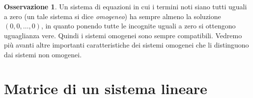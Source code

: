 \documentclass{book}
\theoremstyle{definition}
\newtheorem{oss}{Osservazione}[section]
\theoremstyle{plain}
\begin{document}
\begin{oss}
  \label{oss:eqlinematrici1}
  Un sistema di equazioni in cui i termini noti siano tutti uguali a zero
  (un tale sistema si dice \textit{omogeneo}) ha sempre almeno la
  soluzione $(0,0,\dots,0)$, in quanto ponendo tutte le incognite uguali
  a zero si ottengono uguaglianza vere. Quindi i sistemi omogenei sono
  sempre compatibili. Vedremo più avanti altre importanti caratteristiche
  dei sistemi omogenei che li distinguono dai sistemi non omogenei.
\end{oss}

\section{Matrice di un sistema lineare}
\label{sec:matricediunsistlineare}
\end{document}
